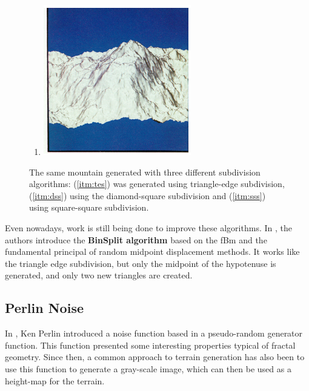\documentclass{acmtog}
\begin{document}
\begin{figure}[!htp]
\begin{center}
\begin{enumerate}
		\item{\includegraphics[width=0.7\columnwidth]{images/algorithm/squaresquare-mountain.png}\label{itm:sss}}
		\end{enumerate}
	\end{center}
	\caption{The same mountain generated with three different subdivision algorithms: (\ref{itm:tes}) was generated using triangle-edge subdivision, (\ref{itm:dss}) using the diamond-square subdivision and (\ref{itm:sss}) using square-square subdivision.}
	\label{fig:miller}
\end{figure}

Even nowadays, work is still being done to improve these algorithms. In \cite{Chen11}, the authors introduce the \textbf{BinSplit algorithm} based on the fBm and the fundamental principal of random midpoint displacement methods. It works like the triangle edge subdivision, but only the midpoint of the hypotenuse is generated, and only two new triangles are created.

\subsection{Perlin Noise}
In \cite{Perlin85}, Ken Perlin introduced a noise function based in a pseudo-random generator function. This function presented some interesting properties typical of fractal geometry. Since then, a common approach to terrain generation has also been to use this function to generate a gray-scale image, which can then be used as a height-map for the terrain.
\end{document}
